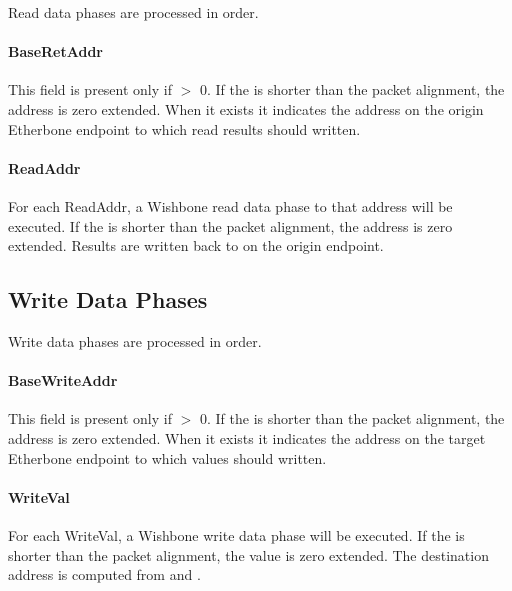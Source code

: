 \documentclass{article}
\begin{document}
Read data phases are processed in order.

\paragraph{BaseRetAddr} \label{field:BaseRetAddr}
This field is present only if  $>$ 0.
If the  is shorter than the packet alignment, 
the address is zero extended.
When it exists it indicates the address on the origin Etherbone endpoint 
to which read results should written.

\paragraph{ReadAddr} \label{field:ReadAddr}
For each ReadAddr, 
a Wishbone read data phase to that address will be executed.
If the  is shorter than the packet alignment, 
the address is zero extended.
Results are written back to  on the origin endpoint.

\subsection{Write Data Phases}

Write data phases are processed in order.

\paragraph{BaseWriteAddr} \label{field:BaseWriteAddr}
This field is present only if  $>$ 0.
If the  is shorter than the packet alignment, 
the address is zero extended.
When it exists it indicates the address on the target Etherbone endpoint 
to which values should written.

\paragraph{WriteVal} \label{field:WriteVal}
For each WriteVal, 
a Wishbone write data phase will be executed.
If the  is shorter than the packet alignment, 
the value is zero extended.
The destination address is computed from  and 
.
\end{document}
